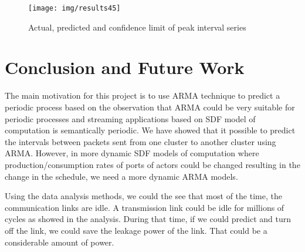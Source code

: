 \documentclass[12pt]{article}
\begin{document}
\begin{figure}[ht!]
\centering
\texttt{[image: img/results45]}
\caption{Actual, predicted and confidence limit of peak interval
series}\label{fig:results45}
\end{figure}

\section{Conclusion and Future Work}
The main motivation for this project is to use ARMA technique to predict a
periodic process based on the observation that ARMA could be very suitable for
periodic processes and streaming applications based on SDF model of computation
is semantically periodic. We have showed that it possible to predict the
intervals between packets sent from one cluster to another cluster using ARMA.
However, in more dynamic SDF models of computation where
production/consumption rates of ports of actors could be changed resulting in
the change in the schedule, we need a more dynamic ARMA models. 

Using the data analysis methods, we could the see that most of the time, the
communication links are idle. A transmission link could be idle for millions of
cycles as showed in the analysis. During that time, if we could predict and turn
off the link, we could save the leakage power of the link. That could be a
considerable amount of power.



\end{document}
